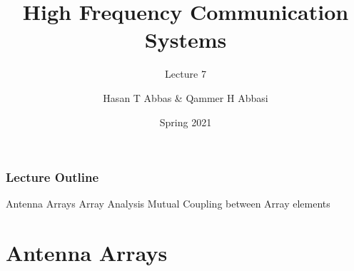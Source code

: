 \documentclass[10pt]{beamer}
\title{High Frequency Communication Systems}
\subtitle{Lecture 7}
\date{Spring 2021}
\author{Hasan T Abbas \& Qammer H Abbasi}
\begin{document}
\maketitle

\begin{frame}[fragile]
    \frametitle{Lecture Outline}
    \begin{outline}[itemize]
        \1 Antenna Arrays
        \1 Array Analysis
        \1 Mutual Coupling between Array elements
    \end{outline}
\end{frame}

\section{Antenna Arrays}
\end{document}
